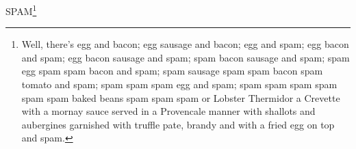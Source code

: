 SPAM\footnote{Well, there's egg and bacon; egg sausage and bacon; egg and spam; egg bacon and spam; egg bacon sausage and spam; spam bacon sausage and spam; spam egg spam spam bacon and spam; spam sausage spam spam bacon spam tomato and spam; spam spam spam egg and spam; spam spam spam spam spam spam baked beans spam spam spam or Lobster Thermidor a Crevette with a mornay sauce served in a Provencale manner with shallots and aubergines garnished with truffle pate, brandy and with a fried egg on top and spam.}
